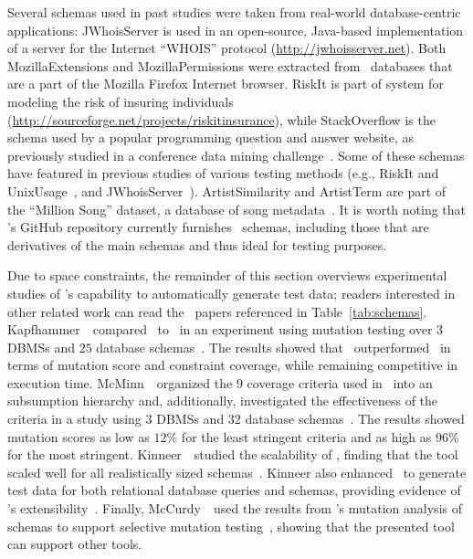 Several schemas used in past studies were taken from real-world database-centric applications: {JWhoisServer} is used in
an open-source, Java-based implementation of a server for the Internet ``WHOIS'' protocol
(\url{http://jwhoisserver.net}).  Both {MozillaExtensions} and {MozillaPermissions} were extracted from
\SQLite~databases that are a part of the Mozilla Firefox Internet browser.  {RiskIt} is part of system for modeling the
risk of insuring individuals (\url{http://sourceforge.net/projects/riskitinsurance}), while {StackOverflow} is the
schema used by a popular programming question and answer website, as previously studied in a conference data mining
challenge~\cite{MSRChallenge2013}. Some of these schemas have featured in previous studies of various testing methods
(e.g., {RiskIt} and {UnixUsage}~\cite{Pan2011b}, and {JWhoisServer}~\cite{Cobb2011}).  {ArtistSimilarity} and
{ArtistTerm} are part of the ``Million Song'' dataset, a database of song metadata~\cite{Bertin-Mahieux2011}. It is
worth noting that \sa's GitHub repository currently furnishes \numprovidedschemas~schemas, including those that are
derivatives of the main schemas and thus ideal for testing purposes.



Due to space constraints, the remainder of this section overviews experimental studies of \sa's capability to
automatically generate test data; readers interested in other related work can read the \numuniquepapers~papers
referenced in Table~\ref{tab:schemas}.  Kapfhammer~\etal~compared \sa~to \dbmonster~in an experiment using mutation
testing over $3$ DBMSs and $25$ database schemas~\cite{kapfhammer2013search}. The results showed that \sa~outperformed
\dbmonster~in terms of mutation score and constraint coverage, while remaining competitive in execution time.
McMinn~\etal~organized the $9$ coverage criteria used in \sa~into an subsumption hierarchy and, additionally,
investigated the effectiveness of the criteria in a study using $3$ DBMSs and $32$ database
schemas~\cite{mcminn2015effectiveness}. The results showed mutation scores as low as $12\%$ for the least stringent
criteria and as high as $96\%$ for the most stringent. Kinneer~\etal~studied the scalability of \sa, finding that the
tool scaled well for all realistically sized schemas~\cite{kinneer2015automatically, Kinneer2015a}. Kinneer also
enhanced \sa~to generate test data for both relational database queries and schemas, providing evidence of \sa's
extensibility~\cite{kinneer2016comp}. Finally, McCurdy~\etal~used the results from \sa's mutation analysis of schemas to
support selective mutation testing~\cite{McCurdy2016}, showing that the presented tool can support other tools.

